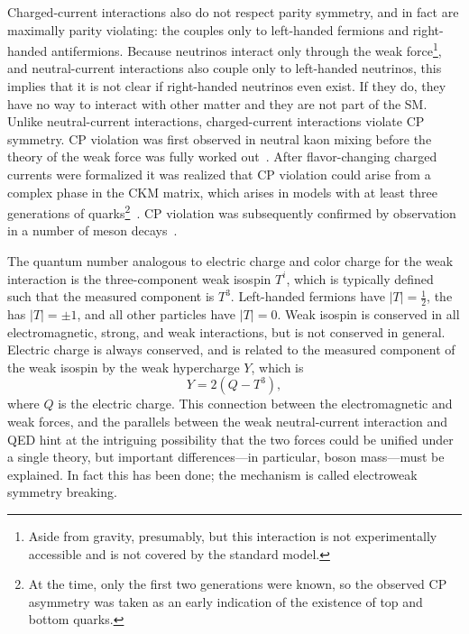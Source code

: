 Charged-current interactions also do not respect parity symmetry, and in fact are maximally parity violating: the {\PW} couples only to left-handed fermions and right-handed antifermions.
Because neutrinos interact only through the weak force\footnote{Aside from gravity, presumably, but this interaction is not experimentally accessible and is not covered by the standard model.}, and neutral-current interactions also couple only to left-handed neutrinos, this implies that it is not clear if right-handed neutrinos even exist.
If they do, they have no way to interact with other matter and they are not part of the SM\@.
Unlike neutral-current interactions, charged-current interactions violate CP symmetry.
CP violation was first observed in neutral kaon mixing before the theory of the weak force was fully worked out~\cite{PhysRevLett.13.138}.
After flavor-changing charged currents were formalized it was realized that CP violation could arise from a complex phase in the CKM matrix, which arises in models with at least three generations of quarks\footnote{At the time, only the first two generations were known, so the observed CP asymmetry was taken as an early indication of the existence of top and bottom quarks.}~\cite{doi:10.1143/PTP.49.652}.
CP violation was subsequently confirmed by observation in a number of meson decays~\cite{AlaviHarati:1999xp,Fanti:1999nm,Aubert:2001sp,Abe:2001xe,Aaij:2012kz,Aaij:2013iua}.

The quantum number analogous to electric charge and color charge for the weak interaction is the three-component weak isospin $T^i$, which is typically defined such that the measured component is $T^3$.
Left-handed fermions have $\lvert T \rvert = \frac{1}{2}$, the {\PWpm} has $\lvert T \rvert = \pm 1$, and all other particles have $\lvert T \rvert = 0$.
Weak isospin is conserved in all electromagnetic, strong, and weak interactions, but is not conserved in general.
Electric charge is always conserved, and is related to the measured component of the weak isospin by the weak hypercharge $Y$, which is
\begin{equation}
  Y = 2\left(Q - T^3\right),
\end{equation}
where $Q$ is the electric charge.
This connection between the electromagnetic and weak forces, and the parallels between the weak neutral-current interaction and QED hint at the intriguing possibility that the two forces could be unified under a single theory, but important differences---in particular, boson mass---must be explained.
In fact this has been done; the mechanism is called electroweak symmetry breaking.



